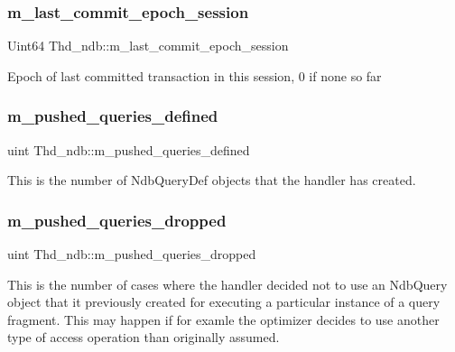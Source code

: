 \subsubsection{\texorpdfstring{m\+\_\+last\+\_\+commit\+\_\+epoch\+\_\+session}{m\_last\_commit\_epoch\_session}}
{\footnotesize\ttfamily Uint64 Thd\+\_\+ndb\+::m\+\_\+last\+\_\+commit\+\_\+epoch\+\_\+session}

Epoch of last committed transaction in this session, 0 if none so far \mbox{\label{classThd__ndb_a99bf12f11431f7c8131a4a652d14078e}} 
\subsubsection{\texorpdfstring{m\+\_\+pushed\+\_\+queries\+\_\+defined}{m\_pushed\_queries\_defined}}
{\footnotesize\ttfamily uint Thd\+\_\+ndb\+::m\+\_\+pushed\+\_\+queries\+\_\+defined}

This is the number of Ndb\+Query\+Def objects that the handler has created. \mbox{\label{classThd__ndb_a49c10f50086db9e89496a7340601d31e}} 
\subsubsection{\texorpdfstring{m\+\_\+pushed\+\_\+queries\+\_\+dropped}{m\_pushed\_queries\_dropped}}
{\footnotesize\ttfamily uint Thd\+\_\+ndb\+::m\+\_\+pushed\+\_\+queries\+\_\+dropped}

This is the number of cases where the handler decided not to use an Ndb\+Query object that it previously created for executing a particular instance of a query fragment. This may happen if for examle the optimizer decides to use another type of access operation than originally assumed. \mbox{\label{classThd__ndb_aa19ebeb5058afcbe72e14c0766b654cf}} 
